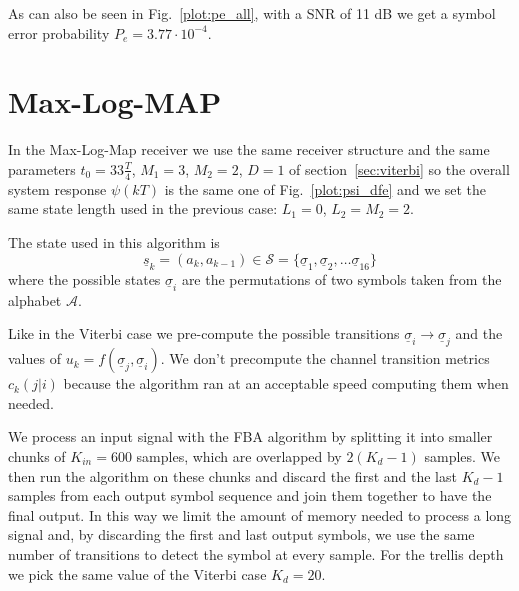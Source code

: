 \documentclass[a4paper,oneside]{article}
\renewcommand{\vec}[1]{\underline{#1}}
\newcommand{\vsigma}[0]{\vec{\sigma}}
\begin{document}
As can also be seen in Fig.~\ref{plot:pe_all}, with a SNR of 11 dB we
get a symbol error probability {\color{red}$P_e = 3.77 \cdot 10^{-4}$.}
\section{Max-Log-MAP}
In the Max-Log-Map receiver we use the same receiver structure and the
same parameters $t_0 = 33\frac{T}{4}$, $M_1 = 3$, $M_2 = 2$, $D=1$ of
section~\ref{sec:viterbi} so the overall system response $\psi(kT)$ is
the same one of Fig.~\ref{plot:psi_dfe} and we set the same state
length used in the previous case: $L_1 = 0$, $L_2 = M_2 = 2$.

The state used in this algorithm is
\begin{equation}
  \vec{s}_k = (a_k,a_{k-1}) \in \mathcal{S} = \{ \vec{\sigma}_1, \vec{\sigma}_2, \dots \vec{\sigma}_{16} \}
\end{equation}
where the possible states $\vsigma_i$ are the permutations of two
symbols taken from the alphabet $\mathcal{A}$.

Like in the Viterbi case we pre-compute the possible transitions
$\vsigma_i \rightarrow \vsigma_j$ and the values of $u_k =
f(\vsigma_j, \vsigma_i)$. We don't precompute the channel transition
metrics $c_k(j | i)$ because the algorithm ran at an acceptable speed
computing them when needed.

We process an input signal with the FBA algorithm by splitting it into
smaller chunks of $K_{in} = 600$ samples, which are overlapped by
$2(K_d-1)$ samples. We then run the algorithm on these chunks and
discard the first and the last $K_d-1$ samples from each output symbol
sequence and join them together to have the final output.  In this way
we limit the amount of memory needed to process a long signal and, by
discarding the first and last output symbols, we use the same number
of transitions to detect the symbol at every sample.  For the trellis
depth we pick the same value of the Viterbi case $K_d = 20$.
\end{document}

